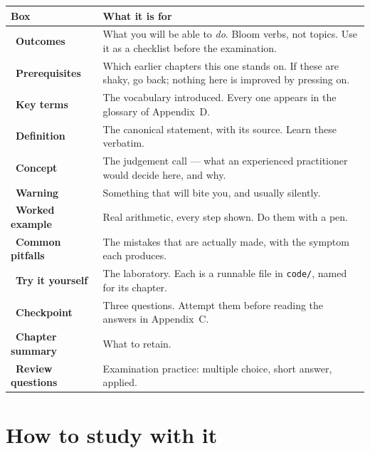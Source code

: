 \begin{longtable}{@{}L{4.6cm}L{10.6cm}@{}}
\toprule
{}
\textbf{Box} & \textbf{What it is for} \\
\midrule
\endhead
{}~\textbf{Outcomes} & What you will be able to \emph{do}. Bloom
verbs, not topics. Use it as a checklist before the examination. \\
~\textbf{Prerequisites} & Which earlier chapters this one stands on.
If these are shaky, go back; nothing here is improved by pressing on. \\
~\textbf{Key terms} & The vocabulary introduced. Every one appears in
the glossary of Appendix~D. \\
~\textbf{Definition} & The canonical statement, with its source. Learn
these verbatim. \\
~\textbf{Concept} & The judgement call --- what an experienced
practitioner would decide here, and why. \\
~\textbf{Warning} & Something that will bite you, and
usually silently. \\
~\textbf{Worked example} & Real arithmetic, every step shown.
Do them with a pen. \\
~\textbf{Common pitfalls} & The mistakes that are actually made, with
the symptom each produces. \\
~\textbf{Try it yourself} & The laboratory. Each is a runnable file
in \texttt{code/}, named for its chapter. \\
~\textbf{Checkpoint} & Three questions. Attempt them before
reading the answers in Appendix~C. \\
~\textbf{Chapter summary} & What to retain. \\
~\textbf{Review questions} & Examination practice: multiple
choice, short answer, applied. \\
\bottomrule
\end{longtable}

\section*{How to study with it}

